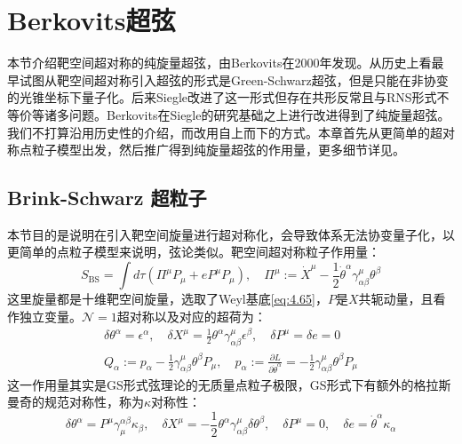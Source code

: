 \chapter{Berkovits超弦}
\label{chap:5}
本节介绍靶空间超对称的纯旋量超弦，由Berkovits在2000年发现\cite{Berkovits:2000fe}。从历史上看最早试图从靶空间超对称引入超弦的形式是Green-Schwarz超弦\cite{Green:1983wt,Green:1983sg}，但是只能在非协变的光锥坐标下量子化。后来Siegle改进了这一形式但存在共形反常且与RNS形式不等价等诸多问题\cite{Siegel:1985xj}。Berkovits在Siegle的研究基础之上进行改进得到了纯旋量超弦。我们不打算沿用历史性的介绍\cite{Berkovits:2002zk,Mafra:2008gkx}，而改用自上而下的方式。本章首先从更简单的超对称点粒子模型出发，然后推广得到纯旋量超弦的作用量，更多细节详见\cite{Berkovits:2017ldz,Mafra:2022wml}。

\section{Brink-Schwarz 超粒子}
本节目的是说明在引入靶空间旋量进行超对称化，会导致体系无法协变量子化，以更简单的点粒子模型来说明，弦论类似。靶空间超对称粒子作用量：\cite{Brink:1981nb,Ferber:1977qx}
\begin{equation}
	\label{eq:5.1}
	S_{\text{BS}}=\int d\tau\left(\Pi^\mu P_\mu+eP^\mu P_\mu\right),\quad\Pi^\mu:=\dot{X}^\mu-\frac{1}{2}\dot{\theta}^\alpha\gamma_{\alpha\beta}^\mu\theta^\beta
\end{equation}
这里旋量都是十维靶空间旋量，选取了Weyl基底\ref{eq:4.65}，$P$是$X$共轭动量，且看作独立变量。$\mathcal{N}=1$超对称以及对应的超荷为：
\begin{equation}
	\label{eq:5.2}
	\begin{gathered}
		\delta\theta^\alpha=\epsilon^\alpha,\quad\delta X^\mu=\frac{1}{2}\theta^\alpha\gamma_{\alpha\beta}^\mu\epsilon^\beta,\quad\delta P^\mu=\delta e=0\\
		Q_\alpha:=p_\alpha-\frac{1}{2}\gamma_{\alpha\beta}^\mu\theta^\beta P_\mu,\quad p_\alpha:=\frac{\partial L}{\partial\dot{\theta}^\alpha}=-\frac{1}{2}\gamma_{\alpha\beta}^\mu\theta^\beta P_\mu
	\end{gathered}
\end{equation}
这一作用量其实是GS形式弦理论的无质量点粒子极限，GS形式下有额外的格拉斯曼奇的规范对称性，称为$\kappa$对称性：
\begin{equation}
	\delta\theta^\alpha=P^\mu\gamma_\mu^{\alpha\beta}\kappa_\beta,\quad\delta X^\mu=-\frac{1}{2}\theta^\alpha\gamma_{\alpha\beta}^\mu\delta\theta^\beta,\quad\delta P^\mu=0,\quad\delta e=\dot{\theta}^\alpha\kappa_\alpha
\end{equation}
